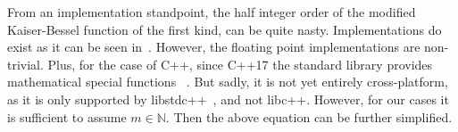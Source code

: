 
From an implementation standpoint, the half integer order of the modified Kaiser-Bessel function
of the first kind, can be quite nasty. Implementations do exist as it can be seen
in~\cite{temme_numerical_1975}. However, the floating point implementations are non-trivial. Plus,
for the case of C++, since C++17 the standard library provides mathematical special functions
~\cite{noauthor_c_nodate, noauthor_stdcyl_bessel_i_nodate}. But sadly, it is not yet entirely
cross-platform, as it is only supported by libstdc++~\cite{noauthor_libstdc_nodate-1}, and not
libc++. However, for our cases it is sufficient to assume \(m \in \mathbb{N}\). Then the above
equation can be further simplified.

